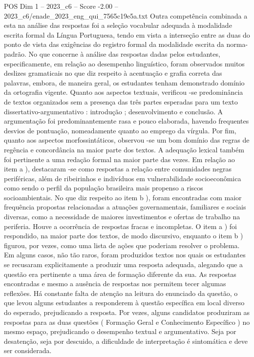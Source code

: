 \begin{textsample}{POS Dim 1 – 2023\_c6 – Score -2.00 – 2023\_c6/enade\_2023\_eng\_qui\_7565c19e5a.txt}
Outra competência combinada a esta na análise das respostas foi a seleção vocabular adequada à modalidade escrita formal da Língua Portuguesa, tendo em vista a interseção entre as duas do ponto de vista das exigências do registro formal da modalidade escrita da norma-padrão.
No que concerne à análise das respostas dadas pelos estudantes, especificamente, em relação ao desempenho linguístico, foram observados muitos deslizes gramaticais no que diz respeito à acentuação e grafia correta das palavras, embora, de maneira geral, os estudantes tenham demonstrado domínio da ortografia vigente.
Quanto aos aspectos textuais, verificou -se predominância de textos organizados sem a presença das três partes esperadas para um texto dissertativo-argumentativo : introdução ; desenvolvimento e conclusão.
A argumentação foi predominantemente rasa e pouco elaborada, havendo frequentes desvios de pontuação, nomeadamente quanto ao emprego da vírgula.
Por fim, quanto aos aspectos morfossintáticos, observou -se um bom domínio das regras de regência e concordância na maior parte dos textos.
A adequação lexical também foi pertinente a uma redação formal na maior parte das vezes.
Em relação ao item a ), destacaram -se como respostas a relação entre comunidades negras periféricas, além de ribeirinhos e indivíduos em vulnerabilidade socioeconômica como sendo o perfil da população brasileira mais propenso a riscos socioambientais.
No que diz respeito ao item b ), foram encontradas com maior frequência propostas relacionadas a atuações governamentais, familiares e sociais diversas, como a necessidade de maiores investimentos e ofertas de trabalho na periferia.
Houve a ocorrência de respostas fracas e incompletas.
O item a ) foi respondido, na maior parte dos textos, de modo discursivo, enquanto o item b ) figurou, por vezes, como uma lista de ações que poderiam resolver o problema.
Em alguns casos, não tão raros, foram produzidos textos nos quais os estudantes se recusaram explicitamente a produzir uma resposta adequada, alegando que a questão era pertinente a uma área de formação diferente da sua.
As respostas encontradas e mesmo a ausência de respostas nos permitem tecer algumas reflexões.
Há constante falta de atenção na leitura do enunciado da questão, o que levou alguns estudantes a responderem à questão específica em local diverso do esperado, prejudicando a resposta.
Por vezes, alguns candidatos produziram as respostas para as duas questões ( Formação Geral e Conhecimento Específico ) no mesmo espaço, prejudicando o desempenho textual e argumentativo.
Seja por desatenção, seja por descuido, a dificuldade de interpretação é sintomática e deve ser considerada.

\end{textsample}
